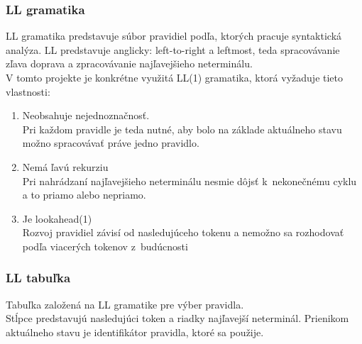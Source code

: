 \documentclass[a4paper]{article}
\begin{document}
\subsubsection{LL gramatika}
LL gramatika predstavuje súbor pravidiel podľa, ktorých pracuje syntaktická analýza. LL predstavuje anglicky: left-to-right a leftmost, teda spracovávanie zľava doprava a zpracovávanie najľavejšieho neterminálu.\\
V tomto projekte je konkrétne využitá LL(1) gramatika, ktorá vyžaduje tieto vlastnosti:
\begin{enumerate}
\item{Neobsahuje nejednoznačnosť.\\
Pri každom pravidle je teda nutné, aby bolo na základe aktuálneho stavu možno spracovávať práve jedno pravidlo.}
\item{Nemá ľavú rekurziu\\
Pri nahrádzaní najľavejšieho neterminálu nesmie dôjsť k~nekonečnému cyklu a to priamo alebo nepriamo.}
\item{Je lookahead(1)\\
Rozvoj pravidiel závisí od nasledujúceho tokenu a nemožno sa rozhodovať podľa viacerých tokenov z~budúcnosti}
\end{enumerate}

\subsubsection{LL tabuľka}
Tabuľka založená na LL gramatike pre výber pravidla.\\
Stĺpce predstavujú nasledujúci token a riadky najľavejší neterminál. Prienikom aktuálneho stavu je identifikátor pravidla, ktoré sa použije.
\end{document}
